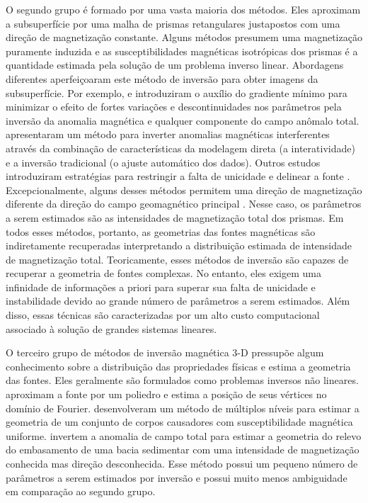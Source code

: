 O segundo grupo é formado por uma vasta maioria dos métodos. Eles aproximam a subsuperfície por uma malha de prismas retangulares justapostos com uma direção de magnetização constante. Alguns métodos presumem uma magnetização puramente induzida \cite[por exemplo, ][]{cribb-1976,li_3-d_1996,pilkington_3-d_1997} e as susceptibilidades magnéticas isotrópicas dos prismas é a quantidade estimada pela solução de um problema inverso linear. Abordagens diferentes aperfeiçoaram este método de inversão para obter imagens da subsuperfície. Por exemplo, \cite{portniaguine_focusing_1999} e \cite{portniaguine_3d_2002} introduziram o auxílio do gradiente mínimo para minimizar o efeito de fortes variações e descontinuidades nos parâmetros pela inversão da anomalia magnética e qualquer componente do campo anômalo total. \cite{barbosa_silva2006} apresentaram um método para inverter anomalias magnéticas interferentes através da combinação de características da modelagem direta (a interatividade) e a inversão tradicional (o ajuste automático dos dados). 
Outros estudos introduziram estratégias para restringir a falta de unicidade e delinear a fonte \cite[]{tontini,pilkington_3d_2009,shamsipour_3d_2011,cella_inversion_2012,abedi-2015}. Excepcionalmente, alguns desses métodos permitem uma direção de magnetização diferente da direção do campo geomagnético principal \cite[por exemplo, ][]{pignatelli-2006}. Nesse caso, os parâmetros a serem estimados são as intensidades de magnetização total dos prismas. Em todos esses métodos, portanto, as geometrias das fontes magnéticas são indiretamente recuperadas interpretando a distribuição estimada de intensidade de magnetização total. Teoricamente, esses métodos de inversão são capazes de recuperar a geometria de fontes complexas. No entanto, eles exigem uma infinidade de informações a priori para superar sua falta de unicidade e instabilidade devido ao grande número de parâmetros a serem estimados. Além disso, essas técnicas são caracterizadas por um alto custo computacional associado à solução de grandes sistemas lineares.

O terceiro grupo de métodos de inversão magnética 3-D pressupõe algum conhecimento sobre a distribuição das propriedades físicas e estima a geometria das fontes.
Eles geralmente são formulados como problemas inversos não lineares. \cite{wang_inversion_1990} aproximam a fonte por um poliedro e estima a posição de seus vértices no domínio de Fourier. 
\cite{wenbin-2017} desenvolveram um método de múltiplos níveis para estimar a geometria de um conjunto de corpos causadores com susceptibilidade magnética uniforme. 
\cite{hidalgo-2019} invertem a anomalia de campo total para estimar a geometria do relevo do embasamento de uma bacia sedimentar com uma intensidade de magnetização conhecida mas direção desconhecida. 
Esse método possui um pequeno número de parâmetros a serem estimados por inversão e possui muito menos ambiguidade em comparação ao segundo grupo.

